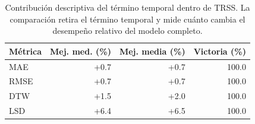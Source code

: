 \begin{table}[htbp]
\centering
\small
\caption{Contribución descriptiva del término temporal dentro de TRSS. La comparación retira el término temporal y mide cuánto cambia el desempeño relativo del modelo completo.}
\label{tab:ch4_temporal_component_summary}
\begin{tabular}{@{}lrrr@{}}
\toprule
Métrica & Mej. med. (\%) & Mej. media (\%) & Victoria (\%) \\
\midrule
MAE & +0.7 & +0.7 & 100.0 \\
RMSE & +0.7 & +0.7 & 100.0 \\
DTW & +1.5 & +2.0 & 100.0 \\
LSD & +6.4 & +6.5 & 100.0 \\
\bottomrule
\end{tabular}
\end{table}

